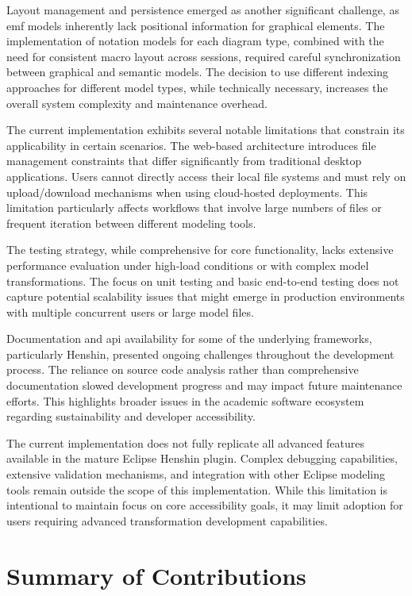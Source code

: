   Layout management and persistence emerged as another significant challenge, as \ac{emf} models inherently lack positional information for graphical elements. The implementation of notation models for each diagram type, combined with the need for consistent macro layout across sessions, required careful synchronization between graphical and semantic models. The decision to use different indexing approaches for different model types, while technically necessary, increases the overall system complexity and maintenance overhead.

  The current implementation exhibits several notable limitations that constrain its applicability in certain scenarios. The web-based architecture introduces file management constraints that differ significantly from traditional desktop applications. Users cannot directly access their local file systems and must rely on upload/download mechanisms when using cloud-hosted deployments. This limitation particularly affects workflows that involve large numbers of files or frequent iteration between different modeling tools.

  The testing strategy, while comprehensive for core functionality, lacks extensive performance evaluation under high-load conditions or with complex model transformations. The focus on unit testing and basic end-to-end testing does not capture potential scalability issues that might emerge in production environments with multiple concurrent users or large model files.

  Documentation and \ac{api} availability for some of the underlying frameworks, particularly Henshin, presented ongoing challenges throughout the development process. The reliance on source code analysis rather than comprehensive documentation slowed development progress and may impact future maintenance efforts. This highlights broader issues in the academic software ecosystem regarding sustainability and developer accessibility.

  The current implementation does not fully replicate all advanced features available in the mature Eclipse Henshin plugin. Complex debugging capabilities, extensive validation mechanisms, and integration with other Eclipse modeling tools remain outside the scope of this implementation. While this limitation is intentional to maintain focus on core accessibility goals, it may limit adoption for users requiring advanced transformation development capabilities.

  \section{Summary of Contributions}
  \label{subsec:summary-contributions}

